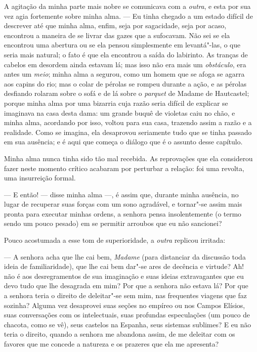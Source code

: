  A agitação da minha parte mais nobre se comunicava com a
\textit{outra}, e esta por sua vez agia fortemente sobre minha alma.
--- Eu tinha chegado a um estado difícil de descrever até que minha
alma, enfim, seja por sagacidade, seja por acaso, encontrou a maneira
de se livrar das gazes que a sufocavam. Não sei se ela encontrou uma
abertura ou se ela pensou simplesmente em levantá"-las, o que seria mais
natural; o fato é que ela encontrou a saída do labirinto. As tranças de
cabelos em desordem ainda estavam lá; mas isso não era mais um
\textit{obstáculo}, era antes um \textit{meio}; minha alma a segurou,
como um homem que se afoga se agarra aos capins do rio; mas o colar de
pérolas se rompeu durante a ação, e as pérolas desfiando rolaram sobre
o sofá e de lá sobre o \textit{parquet} de Madame de Hautcastel; porque
minha alma por uma bizarria cuja razão seria difícil de explicar se
imaginava na casa desta dama: um grande buquê de violetas caiu no chão,
e minha alma, acordando por isso, voltou para sua casa, trazendo assim
a razão e a realidade. Como se imagina, ela desaprovou seriamente tudo
que se tinha passado em sua ausência; e é aqui que começa o diálogo que
é o assunto desse capítulo.

 Minha alma nunca tinha sido tão mal recebida. As reprovações que ela
considerou fazer neste momento crítico acabaram por perturbar a
relação: foi uma revolta, uma insurreição formal.

 --- E então! --- disse minha alma ---, é assim que, durante minha
ausência, no lugar de recuperar suas forças com um sono agradável, e
tornar"-se assim mais pronta para executar minhas ordens, a senhora
pensa insolentemente (o termo sendo um pouco pesado) em se permitir
arroubos que eu não sancionei?

 Pouco acostumada a esse tom de superioridade, a \textit{outra} replicou
irritada:

 --- A senhora acha que lhe cai bem, \textit{Madame} (para distanciar da
discussão toda ideia de familiaridade), que lhe cai bem dar"-se ares de
decência e virtude? Ah! não é aos desregramentos de sua imaginação e
suas ideias extravagantes que eu devo tudo que lhe desagrada em mim?
Por que a senhora não estava lá? Por que a senhora teria o direito de
deleitar"-se sem mim, nas frequentes viagens que faz sozinha? Alguma vez
desaprovei suas seções no empíreo ou nos Campos Elísios, suas
conversações com os intelectuais, suas profundas especulações (um pouco
de chacota, como se vê), seus castelos na Espanha, seus sistemas
sublimes? E eu não teria o direito, quando a senhora me abandona assim,
de me deleitar com os favores que me concede a natureza e os prazeres
que ela me apresenta?

